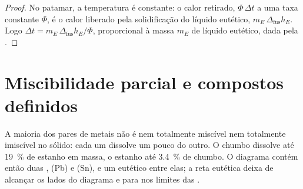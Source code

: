 \begin{proof}
No patamar, a temperatura é constante: o calor retirado, $\Phi\,\Delta t$
a uma taxa constante $\Phi$, é o calor liberado pela solidificação do
líquido eutético, $m_E\,\Delta_{\text{fus}}h_E$. Logo $\Delta t = m_E\,\Delta_{\text{fus}}h_E/
\Phi$, proporcional à massa $m_E$ de líquido eutético, dada pela .
\end{proof}

\section{Miscibilidade parcial e compostos definidos}

A maioria dos pares de metais não é nem totalmente miscível nem totalmente
imiscível no sólido: cada um dissolve um pouco do outro. O chumbo dissolve
até 19~\% de estanho em massa, o estanho até 3.4~\% de chumbo. O diagrama
contém então duas , (Pb) e (Sn), e um eutético entre elas; a
reta eutética deixa de alcançar os lados do diagrama e para nos limites das
.


